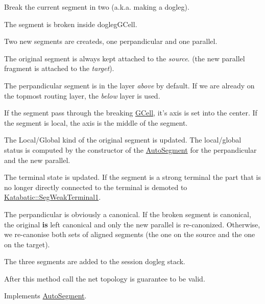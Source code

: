 Break the current segment in two (a.\-k.\-a. making a dogleg).
\begin{DoxyItemize}
\item The segment is broken inside {\ttfamily dogleg\-G\-Cell}.
\item Two new segments are createds, one perpandicular and one parallel.
\item The original segment is always kept attached to the {\itshape source}. (the new parallel fragment is attached to the {\itshape target}).
\item The perpandicular segment is in the layer {\itshape above} by default. If we are already on the topmost routing layer, the {\itshape below} layer is used.
\item If the segment pass through the breaking \hyperlink{classKatabatic_1_1GCell}{G\-Cell}, it's axis is set into the center. If the segment is local, the axis is the middle of the segment.
\item The Local/\-Global kind of the original segment is updated. The local/global status is computed by the constructor of the \hyperlink{classKatabatic_1_1AutoSegment}{Auto\-Segment} for the perpandicular and the new parallel.
\item The terminal state is updated. If the segment is a strong terminal the part that is no longer directly connected to the terminal is demoted to \hyperlink{namespaceKatabatic_a94585537ee1724ea9315578ec54380f4a7b3e09b8ab4cf676fd308535d7fba892}{Katabatic\-::\-Seg\-Weak\-Terminal1}.
\item The perpandicular is obviously a canonical. If the broken segment is canonical, the original {\bfseries is} left canonical and only the new parallel is re-\/canonized. Otherwise, we re-\/canonise both sets of aligned segments (the one on the source and the one on the target).
\item The three segments are added to the session dogleg stack.
\end{DoxyItemize}

After this method call the net topology is guarantee to be valid.

  

Implements \hyperlink{classKatabatic_1_1AutoSegment_a37a14b40295ccb50cd5001891385807b}{Auto\-Segment}.



